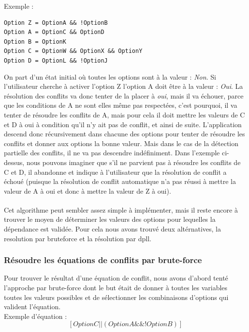 \documentclass[16pts]{report}
\begin{document}
Exemple :\\
\begin{lstlisting}
Option Z = OptionA && !OptionB
Option A = OptionC && OptionD
Option B = OptionK
Option C = OptionW && OptionX && OptionY
Option D = OptionL && !OptionJ
\end{lstlisting}

On part d'un état initial où toutes les options sont à la valeur :
\textit{Non}.  Si l'utilisateur cherche à activer l'option Z l'option A doit
être à la valeur : \textit{Oui}. La résolution des conflits va donc tenter de
la placer à \textit{oui}, mais il va échouer, parce que les conditions de A ne sont elles
même pas respectées, c'est pourquoi, il va tenter de résoudre les conflits de A, mais
pour cela il doit mettre les valeurs de C et D à oui à condition qu'il n'y ait
pas de conflit, et ainsi de suite.  L'application descend donc récursivement dans chacune
des options pour tenter de résoudre les conflits et donner aux options la bonne
valeur. Mais dans le cas de la détection partielle des conflits, il ne va pas
descendre indéfiniment. Dans l'exemple ci-dessus, nous pouvons imaginer que
s'il ne parvient pas à résoudre les conflits de C et D, il abandonne et
indique à l'utilisateur que la résolution de conflit a échoué (puisque la
résolution de conflit automatique n'a pas réussi à mettre la valeur de A à oui
et donc à mettre la valeur de Z à oui).\\
\\

Cet algorithme peut sembler assez simple à implémenter, mais il reste encore
à trouver le moyen de déterminer les valeurs des options pour lequelles la
dépendance est validée. Pour cela nous avons trouvé deux altérnatives, la
resolution par bruteforce et la résolution par dpll.


\subsubsection{Résoudre les équations de conflits par brute-force}
\label{sub:Résoudre les équations de conflits par brute-force}


Pour trouver le résultat d'une équation de conflit, nous avons d'abord tenté
l'approche par brute-force dont le but était de donner à toutes les variables
toutes les valeurs possibles et de sélectionner les combinaisons d'options qui
valident l'équation.
\\

Exemple d'équation :
\[[OptionC || (OptionA \&\& !OptionB)]\]
\end{document}

